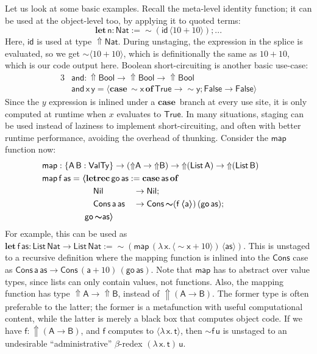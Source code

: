 \documentclass[acmsmall,screen]{acmart}
\newcommand{\mit}[1]{{\mathsf{#1}}}
\newcommand{\msf}[1]{{\mathsf{#1}}}
\newcommand{\mbf}[1]{{\mathbf{#1}}}
\newcommand{\bs}[1]{\boldsymbol{#1}}
\newcommand{\ind}{\hspace{1em}}
\newcommand{\lam}{\lambda\,}
\newcommand{\letrec}{\mbf{letrec}\,}
\newcommand{\of}{\mbf{of}\,}
\newcommand{\go}{\mit{go}}
\newcommand{\letdef}{\mbf{let\,}}
\newcommand{\map}{\mit{map}}
\newcommand{\vas}{\mathsf{as}}
\newcommand{\vn}{\mathsf{n}}
\newcommand{\vA}{\mathsf{A}}
\newcommand{\vB}{\mathsf{B}}
\newcommand{\va}{\mathsf{a}}
\newcommand{\vx}{\mathsf{x}}
\newcommand{\vy}{\mathsf{y}}
\newcommand{\vf}{\mathsf{f}}
\newcommand{\vt}{\mathsf{t}}
\newcommand{\vu}{\mathsf{u}}
\newcommand{\List}{\msf{List}}
\newcommand{\Nil}{\msf{Nil}}
\newcommand{\Cons}{\msf{Cons}}
\newcommand{\Bool}{\msf{Bool}}
\newcommand{\case}{\mbf{case\,}}
\newcommand{\Lift}{{\Uparrow}}
\newcommand{\Up}{{\Uparrow}}
\newcommand{\spl}{{\bs{\sim}}}
\newcommand{\ql}{{\bs{\langle}}}
\newcommand{\qr}{{\bs{\rangle}}}
\newcommand{\VTy}{\msf{ValTy}}
\newcommand{\True}{\msf{True}}
\newcommand{\False}{\msf{False}}
\newcommand{\Nat}{\msf{Nat}}
\theoremstyle{remark}
\newcommand{\id}{\mit{id}}
\newcommand{\qt}[1]{\ql#1\qr}
\begin{document}
Let us look at some basic examples. Recall the meta-level identity function; it
can be used at the object-level too, by applying it to quoted terms:
  \[ \letdef \vn : \Nat := \spl(\id\,\ql 10 + 10 \qr); ... \]
Here, $\id$ is used at type $\Lift \Nat$. During unstaging, the expression in
the splice is evaluated, so we get $\spl\ql 10 + 10 \qr$, which is
definitionally the same as $10 + 10$, which is our code output here. Boolean
short-circuiting is another basic use-case:
\begin{alignat*}{3}
  &\mit{and} : \Up\Bool \to \Up\Bool \to \Up\Bool\\
  &\mit{and}\,\vx\,\vy = \ql\case \spl \vx\,\of \True \to \spl \vy; \False \to \False\qr
\end{alignat*}
Since the $y$ expression is inlined under a $\case$ branch at every use site, it
is only computed at runtime when $x$ evaluates to $\True$. In many situations,
staging can be used instead of laziness to implement short-circuiting, and often
with better runtime performance, avoiding the overhead of thunking. Consider the
$\map$ function now:
\begin{alignat*}{3}
  & \hspace{-5em}\mathrlap{\map : \{\vA\,\vB : \VTy\} \to (\Up \vA \to \Up \vB) \to \Up (\List\,\vA) \to \Up(\List\,\vB)}\\
  & \hspace{-5em}\mathrlap{\map\,\vf\,\vas = \ql\letrec \go\,\vas := \case \vas\,\of}\\
  & \hspace{-5em}\ind\ind\ind\ind\ind \ind\Nil             &&\to \Nil;\\
  & \hspace{-5em}\ind\ind\ind\ind\ind \ind\Cons\,\va\,\vas &&\to \Cons\,\spl(\vf\,\ql \va \qr)\,(\go\,\vas);\\
  & \hspace{-5em}\ind\ind\ind\ind\ind\go\,\spl\vas \qr
\end{alignat*}
For example, this can be used as $\letdef \vf\,\vas : \List\,\Nat \to
\List\,\Nat := \spl(\map\,(\lam \vx.\,\ql \spl \vx + 10 \qr)\,\qt{\vas}) $.
This is unstaged to a recursive definition where the mapping function is inlined
into the $\Cons$ case as $\Cons\,\va\,\vas \to \Cons\,(\va + 10)\,(\go\,\vas)$.
Note that $\map$ has to abstract over value types, since lists can only contain
values, not functions. Also, the mapping function has type $\Up \vA \to \Up
\vB$, instead of $\Up (\vA \to \vB)$. The former type is often preferable to the
latter; the former is a metafunction with useful computational content, while
the latter is merely a black box that computes object code. If we have $\vf :
\Up(\vA \to \vB)$, and $\vf$ computes to $\ql \lam \vx.\,\vt\qr$, then $\spl
\vf\,\vu$ is unstaged to an undesirable ``administrative'' $\beta$-redex $(\lam
\vx.\,\vt)\,\vu$.
\end{document}
